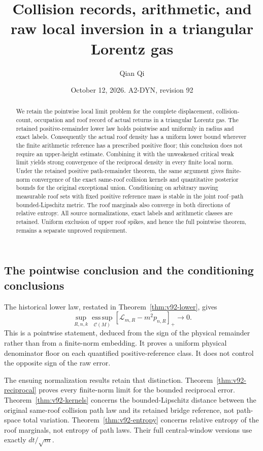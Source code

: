\documentclass[11pt,reqno]{amsart}
\title[Collision records and raw local inversion]{Collision records, arithmetic, and raw local inversion in a triangular Lorentz gas}
\author{Qian Qi}
\date{October 12, 2026. A2-DYN, revision 92}
\numberwithin{equation}{section}
\theoremstyle{definition}
\theoremstyle{remark}\newtheorem{remark}[theorem]{Remark}
\newcommand{\esssup}{\operatorname*{ess\,sup}}
\begin{document}
\raggedbottom
\begin{abstract}
We retain the pointwise local limit problem for the complete displacement,
collision-count, occupation and roof record of actual returns in a
triangular Lorentz gas. The retained positive-remainder lower law holds
pointwise and uniformly in radius and exact labels.
Consequently the actual roof density has a uniform lower bound wherever
the finite arithmetic reference has a prescribed positive floor; this
conclusion does not require an upper-height estimate. Combining it with
the unweakened critical weak limit yields strong convergence of the
reciprocal density in every finite local norm. Under the retained positive
path-remainder theorem, the same argument gives finite-norm convergence
of the exact same-roof collision kernels and quantitative posterior
bounds for the original exceptional union. Conditioning on arbitrary
moving measurable roof sets with fixed positive reference mass is stable
in the joint roof--path bounded-Lipschitz metric. The roof marginals also
converge in both directions of relative entropy. All source normalizations,
exact labels and arithmetic classes are retained. Uniform exclusion of
upper roof spikes, and hence the full pointwise theorem, remains a separate
unproved requirement.
\end{abstract}
\maketitle



\subsection{The pointwise conclusion and the conditioning conclusions}
The historical lower law, restated in Theorem~\ref{thm:v92-lower}, gives
\[
 \sup_{R,n,k}\esssup_{\mathcal C(M)}[\mathcal L_{m,R}-m^2p_{n,R}]_+
                                                     \longrightarrow0.
\]
This is a pointwise statement, deduced from the sign of the physical
remainder rather than from a finite-norm embedding. It proves a uniform
physical denominator floor on each quantified positive-reference class.
It does not control the opposite sign of the raw error.

The ensuing normalization results retain that distinction.
Theorem~\ref{thm:v92-reciprocal} proves every finite-norm limit for the
bounded reciprocal error. Theorem~\ref{thm:v92-kernels} concerns the
bounded-Lipschitz distance between the original same-roof collision path
law and its retained bridge reference, not path-space total variation.
Theorem~\ref{thm:v92-entropy} concerns relative entropy of the roof
marginals, not entropy of path laws. Their full central-window versions
use exactly $dt/\sqrt m$.
\end{document}
